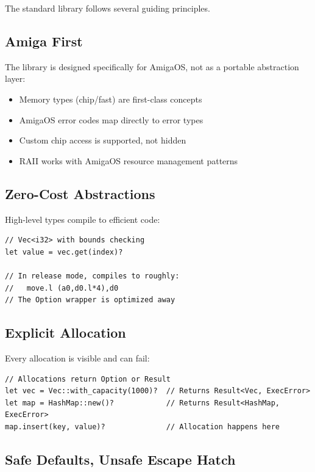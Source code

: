 The standard library follows several guiding principles.

\subsection{Amiga First}

The library is designed specifically for AmigaOS, not as a portable abstraction layer:

\begin{itemize}
    \item Memory types (chip/fast) are first-class concepts
    \item AmigaOS error codes map directly to error types
    \item Custom chip access is supported, not hidden
    \item RAII works with AmigaOS resource management patterns
\end{itemize}

\subsection{Zero-Cost Abstractions}

High-level types compile to efficient code:

\begin{lstlisting}
// Vec<i32> with bounds checking
let value = vec.get(index)?

// In release mode, compiles to roughly:
//   move.l (a0,d0.l*4),d0
// The Option wrapper is optimized away
\end{lstlisting}

\subsection{Explicit Allocation}

Every allocation is visible and can fail:

\begin{lstlisting}
// Allocations return Option or Result
let vec = Vec::with_capacity(1000)?  // Returns Result<Vec, ExecError>
let map = HashMap::new()?            // Returns Result<HashMap, ExecError>
map.insert(key, value)?              // Allocation happens here
\end{lstlisting}

\subsection{Safe Defaults, Unsafe Escape Hatch}


